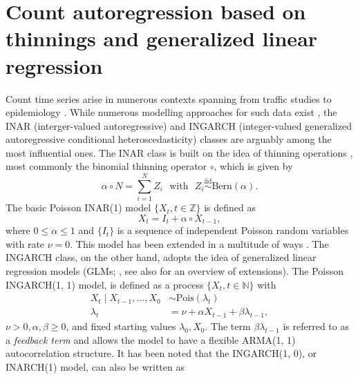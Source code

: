 \documentclass{article}
\begin{document}

\maketitle

\section{Count autoregression based on thinnings and generalized linear regression}
\label{sec:intro}

Count time series arise in numerous contexts spanning from traffic studies \cite{Quddus2008} to epidemiology \cite{Bracher2022}. While numerous modelling approaches for such data exist \cite{Davis2021}, the INAR (interger-valued autoregressive) and INGARCH (integer-valued generalized autoregressive conditional heteroscedasticity) classes are arguably among the most influential ones. The INAR class is built on the idea of thinning operations \citep{Steutel1979}, most commonly the binomial thinning operator $\circ$, which is given by
$$
\alpha \circ N = \sum_{i = 1}^N Z_i \ \ \ \text{with} \ \ \ Z_i \stackrel{\text{iid}}{\sim} \text{Bern}(\alpha).
$$
The basic Poisson INAR(1) model $\{X_t, t \in \mathbb{Z}\}$ \citep{McKenzie1985, Al-Osh1987} is defined as
\begin{equation}
X_t = I_t + \alpha \circ X_{t - 1},\label{eq:inar1}
\end{equation}
where $0 \leq \alpha \leq 1$ and $\{I_t\}$ is a sequence of independent Poisson random variables with rate $\nu = 0$. This model has been extended in a multitude of ways \cite{Scotto2015}. The INGARCH class, on the other hand, adopts the idea of generalized linear regression models (GLMs; \cite{Ferland2006, Fokianos2009}, see also \citep{Fokianos2016} for an overview of extensions). The Poisson INGARCH(1, 1) model, is defined as a process $\{X_t, t \in \mathbb{N}\}$ with
\begin{align}
X_t \mid X_{t - 1}, \dots, X_0 & \sim \text{Pois}(\lambda_t) \label{eq:ingarch11}\\
\lambda_t & = \nu + \alpha X_{t - 1} + \beta \lambda_{t - 1},\nonumber
\end{align}
$\nu > 0, \alpha, \beta \geq 0$, and fixed starting values $\lambda_0, X_0$. The term $\beta \lambda_{t - 1}$ is referred to as a \textit{feedback term} and allows the model to have a flexible ARMA(1, 1) autocorrelation structure.  It has been noted that the INGARCH(1, 0), or INARCH(1) model, can also be written as \citep{Weiss2015}
\end{document}
